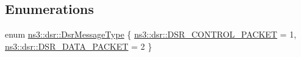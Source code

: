 \subsection*{Enumerations}
\begin{DoxyCompactItemize}
\item 
enum \hyperlink{namespacens3_1_1dsr_a7c80bcec67d78dc149a0e503014d07c5}{ns3\+::dsr\+::\+Dsr\+Message\+Type} \{ \hyperlink{namespacens3_1_1dsr_a7c80bcec67d78dc149a0e503014d07c5abeaa53bf31d961c221e4e377ef6022f2}{ns3\+::dsr\+::\+D\+S\+R\+\_\+\+C\+O\+N\+T\+R\+O\+L\+\_\+\+P\+A\+C\+K\+ET} = 1, 
\hyperlink{namespacens3_1_1dsr_a7c80bcec67d78dc149a0e503014d07c5ad29c69f5a6ad5fbb5eec5524f553e315}{ns3\+::dsr\+::\+D\+S\+R\+\_\+\+D\+A\+T\+A\+\_\+\+P\+A\+C\+K\+ET} = 2
 \}
\end{DoxyCompactItemize}
